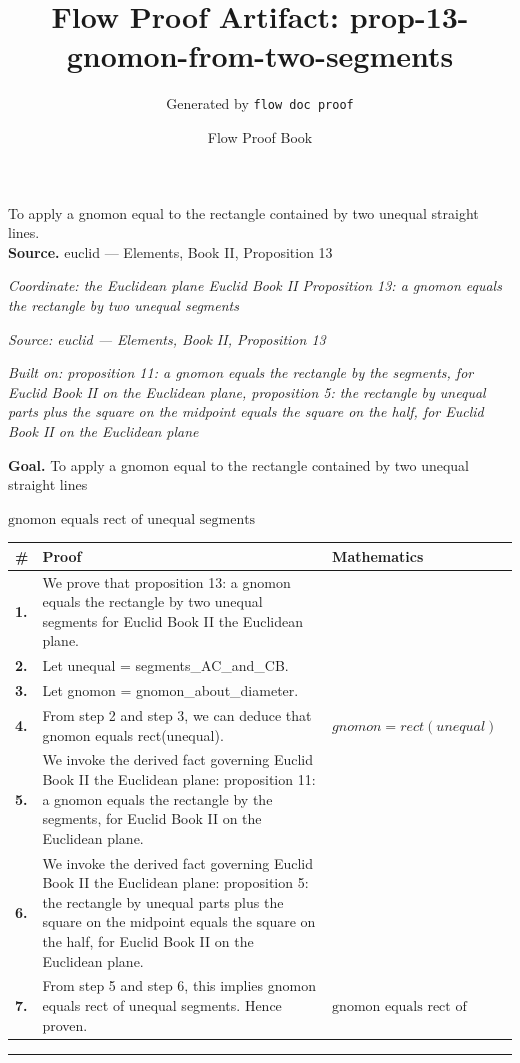 \documentclass[11pt]{article}
\title{Flow Proof Artifact: prop-13-gnomon-from-two-segments}
\author{Generated by \texttt{flow doc proof}}
\date{Flow Proof Book}
\theoremstyle{definition}
\begin{document}
\maketitle
To apply a gnomon equal to the rectangle contained by two unequal straight lines.\\[0.5em]
\textbf{Source.} euclid — Elements, Book II, Proposition 13\\[0.5em]
\bigskip
{}\par
\smallskip\noindent\textit{Coordinate: the Euclidean plane \cdot Euclid Book II \cdot Proposition 13: a gnomon equals the rectangle by two unequal segments}\par
\smallskip\noindent\textit{Source: euclid — Elements, Book II, Proposition 13}\par
\smallskip\noindent\textit{Built on: proposition 11: a gnomon equals the rectangle by the segments, for Euclid Book II on the Euclidean plane, proposition 5: the rectangle by unequal parts plus the square on the midpoint equals the square on the half, for Euclid Book II on the Euclidean plane}\par
\medskip
\noindent\textbf{Goal.} To apply a gnomon equal to the rectangle contained by two unequal straight lines\par
\noindent$\displaystyle \text{gnomon equals rect of unequal segments}$\par
\medskip
\noindent
\begin{tabular}{@{} >{\raggedright\arraybackslash}p{} >{\raggedright\arraybackslash}p{} >{\raggedleft\arraybackslash}p{} @{}}
\textbf{\#} & \textbf{Proof} & \textbf{Mathematics} \\
\midrule
\textbf{1.} & We prove that proposition 13: a gnomon equals the rectangle by two unequal segments for Euclid Book II the Euclidean plane. & \\[0.45em]
\textbf{2.} & Let unequal = segments\_AC\_and\_CB. & \\[0.45em]
\textbf{3.} & Let gnomon = gnomon\_about\_diameter. & \\[0.45em]
\textbf{4.} & From step 2 and step 3, we can deduce that gnomon equals rect(unequal). & $\displaystyle gnomon = rect(unequal)$ \\[0.45em]
\textbf{5.} & We invoke the derived fact governing Euclid Book II the Euclidean plane: proposition 11: a gnomon equals the rectangle by the segments, for Euclid Book II on the Euclidean plane. & \\[0.45em]
\textbf{6.} & We invoke the derived fact governing Euclid Book II the Euclidean plane: proposition 5: the rectangle by unequal parts plus the square on the midpoint equals the square on the half, for Euclid Book II on the Euclidean plane. & \\[0.45em]
\textbf{7.} & From step 5 and step 6, this implies gnomon equals rect of unequal segments. Hence proven. & $\displaystyle \text{gnomon equals rect of unequal segments}$ \\[0.45em]
\bottomrule
\end{tabular}
\label{thm:Geometry-Euclid Book II-proposition_13_a_gnomon_equals_the_rectangle_by_two_unequal_segments}
\par\medskip\hrule
\end{document}
